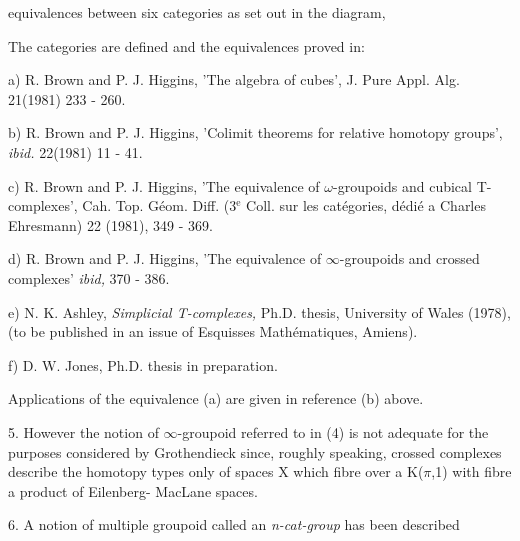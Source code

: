 
equivalences between six categories as set out in the diagram,


The categories are defined and the equivalences proved in:

a) R. Brown and P. J. Higgins, 'The algebra of cubes',
J. Pure Appl. Alg. 21(1981) 233 - 260.

b) R. Brown and P. J. Higgins, 'Colimit theorems for relative
homotopy groups', \textit{ibid.} 22(1981) 11 - 41.

c) R. Brown and P. J. Higgins, 'The equivalence of $\omega$-groupoids and
cubical T-complexes', Cah. Top. Géom. Diff. (3$^{\text{e}}$ Coll. sur les
catégories, dédié a Charles Ehresmann) 22 (1981), 349 - 369.

d) R. Brown and P. J. Higgins, 'The equivalence of $\infty$-groupoids and
crossed complexes' \textit{ibid,} 370 - 386.

e) N. K. Ashley, \textit{Simplicial T-complexes,} Ph.D. thesis, University
of Wales (1978),(to be published in an issue of Esquisses
Mathématiques, Amiens).

f) D. W. Jones, Ph.D. thesis in preparation.

Applications of the equivalence (a) are given in reference (b)
above.

5. However the notion of $\infty$-groupoid referred to in (4) is not adequate
for the purposes considered by Grothendieck since, roughly speaking,
crossed complexes describe the homotopy types only of spaces X
which fibre over a K($\pi$,1) with fibre a product of Eilenberg-
MacLane spaces.

6. A notion of multiple groupoid called an \textit{n-cat-group} has been described

